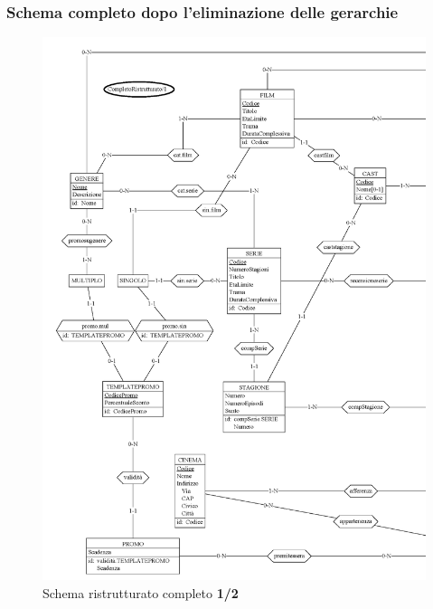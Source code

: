 \documentclass[a4paper,12pt]{report}
\begin{document}
	\subsubsection{Schema completo dopo l'eliminazione delle gerarchie}
	\begin{figure}[H]
		\centering
		\includegraphics[width=450pt]{ER/ristrutturazione/ristcomp1.png}
		\caption{Schema ristrutturato completo \textbf{1/2}}
	\end{figure}
\end{document}

